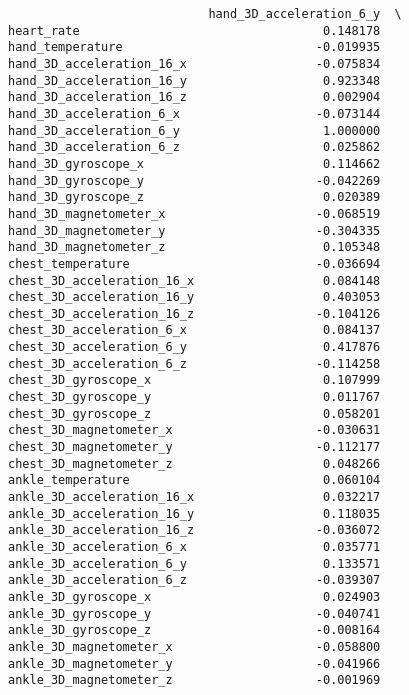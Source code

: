 \documentclass[11pt]{article}
\begin{document}
\begin{verbatim}
                            hand_3D_acceleration_6_y  \
heart_rate                                  0.148178   
hand_temperature                           -0.019935   
hand_3D_acceleration_16_x                  -0.075834   
hand_3D_acceleration_16_y                   0.923348   
hand_3D_acceleration_16_z                   0.002904   
hand_3D_acceleration_6_x                   -0.073144   
hand_3D_acceleration_6_y                    1.000000   
hand_3D_acceleration_6_z                    0.025862   
hand_3D_gyroscope_x                         0.114662   
hand_3D_gyroscope_y                        -0.042269   
hand_3D_gyroscope_z                         0.020389   
hand_3D_magnetometer_x                     -0.068519   
hand_3D_magnetometer_y                     -0.304335   
hand_3D_magnetometer_z                      0.105348   
chest_temperature                          -0.036694   
chest_3D_acceleration_16_x                  0.084148   
chest_3D_acceleration_16_y                  0.403053   
chest_3D_acceleration_16_z                 -0.104126   
chest_3D_acceleration_6_x                   0.084137   
chest_3D_acceleration_6_y                   0.417876   
chest_3D_acceleration_6_z                  -0.114258   
chest_3D_gyroscope_x                        0.107999   
chest_3D_gyroscope_y                        0.011767   
chest_3D_gyroscope_z                        0.058201   
chest_3D_magnetometer_x                    -0.030631   
chest_3D_magnetometer_y                    -0.112177   
chest_3D_magnetometer_z                     0.048266   
ankle_temperature                           0.060104   
ankle_3D_acceleration_16_x                  0.032217   
ankle_3D_acceleration_16_y                  0.118035   
ankle_3D_acceleration_16_z                 -0.036072   
ankle_3D_acceleration_6_x                   0.035771   
ankle_3D_acceleration_6_y                   0.133571   
ankle_3D_acceleration_6_z                  -0.039307   
ankle_3D_gyroscope_x                        0.024903   
ankle_3D_gyroscope_y                       -0.040741   
ankle_3D_gyroscope_z                       -0.008164   
ankle_3D_magnetometer_x                    -0.058800   
ankle_3D_magnetometer_y                    -0.041966   
ankle_3D_magnetometer_z                    -0.001969   


\end{verbatim}
\end{document}
